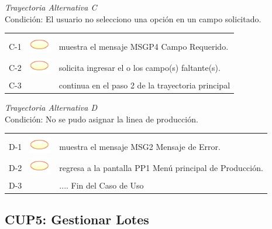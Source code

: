 \documentclass[10pt,spanish]{article}
\providecommand{\tabularnewline}{\\}
\begin{document}
	
	\textit{Trayectoria Alternativa C}\\
	Condición: El usuario no selecciono una opción en un campo solicitado.\\
	\begin{tabular}{ccl}
	& & \tabularnewline
	C-1 & \includegraphics{sistema} & muestra el mensaje MSGP4 Campo Requerido.\tabularnewline	
	C-2 & \includegraphics{sistema} & solicita ingresar el o los campo(s) faltante(s).\tabularnewline		
	C-3 & & continua en el paso 2 de la trayectoria principal\tabularnewline
	\end{tabular}	
	
	\textit{Trayectoria Alternativa D}\\
	Condición: No se pudo asignar la linea de producción.\\
	\begin{tabular}{ccl}
	& & \tabularnewline
	D-1 & \includegraphics{sistema} & muestra el mensaje MSG2 Mensaje de Error.\tabularnewline	
	D-2 & \includegraphics{sistema} & regresa a la pantalla PP1 Menú principal de Producción.\tabularnewline		
	D-3 & & .... Fin del Caso de Uso\tabularnewline
	\end{tabular}				
\newpage
\subsection{CUP5: Gestionar Lotes}
\end{document}
